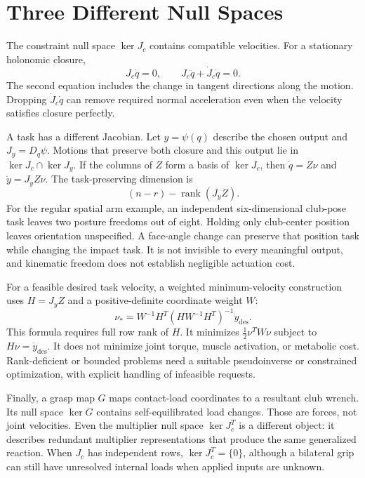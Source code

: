 \section{Three Different Null Spaces}
\label{sec:constraint_jacobian_nullspace}

The constraint null space $\ker J_c$ contains compatible velocities. For a
stationary holonomic closure,
\begin{equation}
 J_c\dot q=0,\qquad J_c\ddot q+\dot J_c\dot q=0.
 \label{eq:velocity_constraint}
\end{equation}
The second equation includes the change in tangent directions along the motion.
Dropping $\dot J_c\dot q$ can remove required normal acceleration even when the
velocity satisfies closure perfectly.

A task has a different Jacobian. Let $y=\psi(q)$ describe the chosen output and
$J_y=D_q\psi$. Motions that preserve both closure and this output lie in
$\ker J_c\cap\ker J_y$. If the columns of $Z$ form a basis of $\ker J_c$, then
$\dot q=Z\nu$ and $\dot y=J_yZ\nu$. The task-preserving dimension is
\begin{equation}
 (n-r)-\operatorname{rank}(J_yZ).
 \label{eq:task_null_dimension}
\end{equation}
For the regular spatial arm example, an independent six-dimensional club-pose
task leaves two posture freedoms out of eight. Holding only club-center position
leaves orientation unspecified. A face-angle change can preserve that position
task while changing the impact task. It is not invisible to every meaningful
output, and kinematic freedom does not establish negligible actuation cost.

For a feasible desired task velocity, a weighted minimum-velocity construction
uses $H=J_yZ$ and a positive-definite coordinate weight $W$:
\begin{equation}
 \nu_* = W^{-1}H^T(HW^{-1}H^T)^{-1}\dot y_{\mathrm{des}}.
 \label{eq:pseudoinverse_solution}
\end{equation}
This formula requires full row rank of $H$. It minimizes
$\tfrac12\nu^TW\nu$ subject to $H\nu=\dot y_{\mathrm{des}}$. It does not minimize
joint torque, muscle activation, or metabolic cost. Rank-deficient or bounded
problems need a suitable pseudoinverse or constrained optimization, with explicit
handling of infeasible requests.

Finally, a grasp map $G$ maps contact-load coordinates to a resultant club
wrench. Its null space $\ker G$ contains self-equilibrated load changes. Those
are forces, not joint velocities. Even the multiplier null space $\ker J_c^T$
is a different object: it describes redundant multiplier representations that
produce the same generalized reaction. When $J_c$ has independent rows,
$\ker J_c^T=\{0\}$, although a bilateral grip can still have unresolved internal
loads when applied inputs are unknown.

